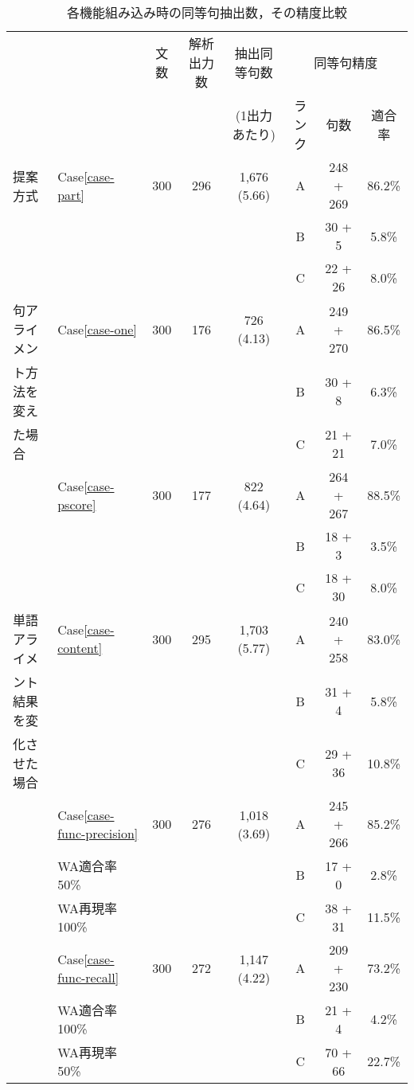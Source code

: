 \begin{table*}
\begin{center}
\caption{各機能組み込み時の同等句抽出数，その精度比較}
\label{tbl-accuracy}
{\smalltable\footnotesize 
\begin{tabular}{l|l|ccc|ccc}
\hline\hline
& & 文数 & 解析出力数 & 抽出同等句数  & \multicolumn{3}{|c}{同等句精度} \\
\cline{6-8}
& &        &            & (1出力あたり) & ランク & 句数 & 適合率 \\
\hline
提案方式 & Case\ref{case-part}
    & 300 & 296 & 1,676 (5.66) & A   & 248 + 269 & 86.2\% \\
&   &     &     &              & B   &  30 +   5 &  5.8\% \\
&   &     &     &              & C   &  22 +  26 &  8.0\% \\
\hline
句アライメン & Case\ref{case-one}
             & 300 & 176 & 726 (4.13) & A   & 249 + 270 & 86.5\% \\
ト方法を変え & &     &     &            & B   &  30 +   8 &  6.3\% \\
た場合       & &     &     &            & C   &  21 +  21 &  7.0\% \\
\cline{2-8}
& Case\ref{case-pscore}
    & 300 & 177 & 822 (4.64) & A   & 264 + 267 & 88.5\% \\
&   &     &     &            & B   &  18 +   3 &  3.5\% \\
&   &     &     &            & C   &  18 +  30 &  8.0\% \\
\hline
単語アライメ & Case\ref{case-content}
                 & 300 & 295 & 1,703 (5.77) & A   & 240 + 258 & 83.0\% \\
ント結果を変 & &     &     &              & B   &  31 +   4 &  5.8\% \\
化させた場合 & &     &     &              & C   &  29 +  36 & 10.8\% \\
\cline{2-8}
& Case\ref{case-func-precision}
                & 300 & 276 & 1,018 (3.69) & A   & 245 + 266 & 85.2\% \\
& WA適合率50\%  &     &     &              & B   &  17 +   0 &  2.8\% \\
& WA再現率100\% &     &     &              & C   &  38 +  31 & 11.5\% \\
\cline{2-8}
& Case\ref{case-func-recall}
                & 300 & 272 & 1,147 (4.22) & A   & 209 + 230 & 73.2\% \\
& WA適合率100\% &     &     &              & B   &  21 +   4 &  4.2\% \\
& WA再現率50\%  &     &     &              & C   &  70 +  66 & 22.7\% \\
\hline
\end{tabular}
}
\end{center}
\end{table*}


